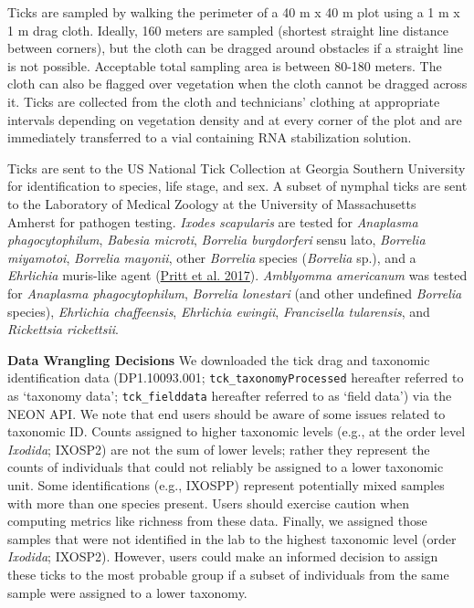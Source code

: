 \documentclass[
  12pt,
]{article}
\begin{document}
Ticks are sampled by walking the perimeter of a 40 m x 40 m plot using a 1 m x 1 m drag cloth. Ideally, 160 meters are sampled (shortest straight line distance between corners), but the cloth can be dragged around obstacles if a straight line is not possible. Acceptable total sampling area is between 80-180 meters. The cloth can also be flagged over vegetation when the cloth cannot be dragged across it. Ticks are collected from the cloth and technicians' clothing at appropriate intervals depending on vegetation density and at every corner of the plot and are immediately transferred to a vial containing RNA stabilization solution.

Ticks are sent to the US National Tick Collection at Georgia Southern University for identification to species, life stage, and sex. A subset of nymphal ticks are sent to the Laboratory of Medical Zoology at the University of Massachusetts Amherst for pathogen testing. \emph{Ixodes scapularis} are tested for \emph{Anaplasma phagocytophilum}, \emph{Babesia microti}, \emph{Borrelia burgdorferi} sensu lato, \emph{Borrelia miyamotoi}, \emph{Borrelia mayonii}, other \emph{Borrelia} species (\emph{Borrelia} sp.), and a \emph{Ehrlichia} muris-like agent (\protect\hyperlink{ref-pritt2017proposal}{Pritt et al. 2017}). \emph{Amblyomma americanum} was tested for \emph{Anaplasma phagocytophilum}, \emph{Borrelia lonestari} (and other undefined \emph{Borrelia} species), \emph{Ehrlichia chaffeensis}, \emph{Ehrlichia ewingii}, \emph{Francisella tularensis}, and \emph{Rickettsia rickettsii}.

\textbf{Data Wrangling Decisions} We downloaded the tick drag and taxonomic identification data (DP1.10093.001; \texttt{tck\_taxonomyProcessed} hereafter referred to as `taxonomy data'; \texttt{tck\_fielddata} hereafter referred to as `field data') via the NEON API. We note that end users should be aware of some issues related to taxonomic ID. Counts assigned to higher taxonomic levels (e.g., at the order level \emph{Ixodida}; IXOSP2) are not the sum of lower levels; rather they represent the counts of individuals that could not reliably be assigned to a lower taxonomic unit. Some identifications (e.g., IXOSPP) represent potentially mixed samples with more than one species present. Users should exercise caution when computing metrics like richness from these data. Finally, we assigned those samples that were not identified in the lab to the highest taxonomic level (order \emph{Ixodida}; IXOSP2). However, users could make an informed decision to assign these ticks to the most probable group if a subset of individuals from the same sample were assigned to a lower taxonomy.
\end{document}
